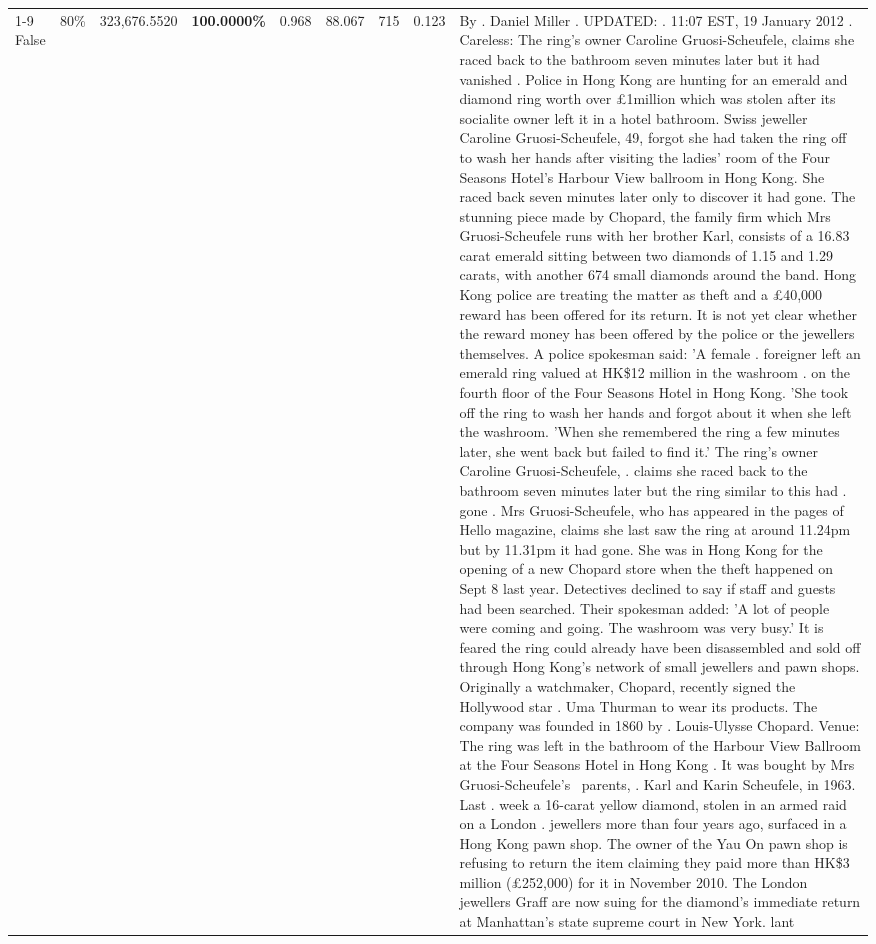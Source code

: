 \begin{table}[H]
\begin{tabular}{lllrlllll}
\cline{1-9} \cline{2-9}
False & 80\% & 323,676.5520 & \bfseries \color{red} 100.0000\% & 0.968 & 88.067 & 715 & 0.123 & By . Daniel Miller . UPDATED: . 11:07 EST, 19 January 2012 . Careless: The ring's owner Caroline Gruosi-Scheufele, claims she raced back to the bathroom seven minutes later but it had vanished . Police in Hong Kong are hunting for an emerald and diamond ring worth over £1million which was stolen after its socialite owner left it in a hotel bathroom. Swiss jeweller Caroline Gruosi-Scheufele, 49, forgot she had taken the ring off to wash her hands after visiting the ladies' room of the Four Seasons Hotel's Harbour View ballroom in Hong Kong. She raced back seven minutes later only to discover it had gone. The stunning piece made by Chopard, the family firm which Mrs Gruosi-Scheufele runs with her brother Karl, consists of a 16.83 carat emerald sitting between two diamonds of 1.15 and 1.29 carats, with another 674 small diamonds around the band. Hong Kong police are treating the matter as theft and a £40,000 reward has been offered for its return. It is not yet clear whether the reward money has been offered by the police or the jewellers themselves. A police spokesman said: 'A female . foreigner left an emerald ring valued at HK\$12 million in the washroom . on the fourth floor of the Four Seasons Hotel in Hong Kong. 'She took off the ring to wash her hands and forgot about it when she left the washroom. 'When she remembered the ring a few minutes later, she went back but failed to find it.' The ring's owner Caroline Gruosi-Scheufele, . claims she raced back to the bathroom seven minutes later but the ring similar to this had . gone . Mrs Gruosi-Scheufele, who has appeared in the pages of Hello magazine, claims she last saw the ring at around 11.24pm but by 11.31pm it had gone. She was in Hong Kong for the opening of a new Chopard store when the theft happened on Sept 8 last year. Detectives declined to say if staff and guests had been searched. Their spokesman added: 'A lot of people were coming and going. The washroom was very busy.' It is feared the ring could already have been disassembled and sold off through Hong Kong's network of small jewellers and pawn shops. Originally a watchmaker, Chopard, recently signed the Hollywood star . Uma Thurman to wear its products. The company was founded in 1860 by . Louis-Ulysse Chopard. Venue: The ring was left in the bathroom of the Harbour View Ballroom at the Four Seasons Hotel in Hong Kong . It was bought by Mrs Gruosi-Scheufele's  parents, . Karl and Karin Scheufele, in 1963. Last . week a 16-carat yellow diamond, stolen in an armed raid on a London . jewellers more than four years ago, surfaced in a Hong Kong pawn shop. The owner of the Yau On pawn shop is refusing to return the item claiming they paid more than HK\$3 million (£252,000) for it in November 2010. The London jewellers Graff are now suing for the diamond’s immediate return at Manhattan’s state supreme court in New York. lant \\

\end{tabular}
\end{table}
